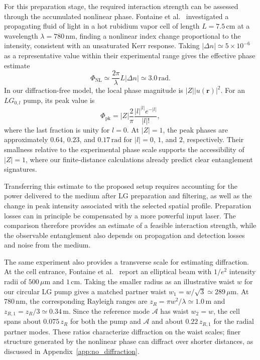 \documentclass[%
 reprint,
 amsmath,amssymb,
 aps,
pra,
twocolumn,
]{revtex4-2}
\begin{document}
For this preparation stage, the required interaction strength can be assessed through the accumulated nonlinear phase. Fontaine et al.~\cite{Fontaine2020Bogoliubov} investigated a propagating fluid of light in a hot rubidium vapor cell of length $L=7.5\,\mathrm{cm}$ at a wavelength $\lambda=780\,\mathrm{nm}$, finding a nonlinear index change proportional to the intensity, consistent with an unsaturated Kerr response. Taking $|\Delta n|\simeq5\times10^{-6}$ as a representative value within their experimental range gives the effective phase estimate
\begin{equation}
    \Phi_{\mathrm{NL}}\simeq\frac{2\pi}{\lambda}L|\Delta n|
    \simeq 3.0\,\mathrm{rad}.
\end{equation}
In our diffraction-free model, the local phase magnitude is $|Z||u(\mathbf r)|^2$. For an $LG_{0,l}$ pump, its peak value is
\begin{equation}
    \Phi_{\mathrm{pk}}=|Z|\frac{2}{\pi}
    \frac{|l|^{|l|}e^{-|l|}}{|l|!},
\end{equation}
where the last fraction is unity for $l=0$. At $|Z|=1$, the peak phases are approximately $0.64$, $0.23$, and $0.17\,\mathrm{rad}$ for $|l|=0$, $1$, and $2$, respectively. Their smallness relative to the experimental phase scale supports the accessibility of $|Z|=1$, where our finite-distance calculations already predict clear entanglement signatures.

Transferring this estimate to the proposed setup requires accounting for the power delivered to the medium after LG preparation and filtering, as well as the change in peak intensity associated with the selected spatial profile. Preparation losses can in principle be compensated by a more powerful input laser. The comparison therefore provides an estimate of a feasible interaction strength, while the observable entanglement also depends on propagation and detection losses and noise from the medium.

The same experiment also provides a transverse scale for estimating diffraction. At the cell entrance, Fontaine et al.~\cite{Fontaine2020Bogoliubov} report an elliptical beam with $1/e^2$ intensity radii of $500\,\mu\mathrm{m}$ and $1\,\mathrm{cm}$. Taking the smaller radius as an illustrative waist $w$ for our circular LG pump gives a matched partner waist $w_1=w/\sqrt{3}\simeq 289\,\mu\mathrm{m}$. At $780\,\mathrm{nm}$, the corresponding Rayleigh ranges are $z_R=\pi w^2/\lambda\simeq 1.0\,\mathrm{m}$ and $z_{R,1}=z_R/3\simeq 0.34\,\mathrm{m}$. Since the reference mode $\mathcal A$ has waist $w_2=w$, the cell spans about $0.075\,z_R$ for both the pump and $\mathcal A$ and about $0.22\,z_{R,1}$ for the radial partner modes. These ratios characterize diffraction on the waist scales; finer structure generated by the nonlinear phase can diffract over shorter distances, as discussed in Appendix~\ref{app:no_diffraction}.
\end{document}
